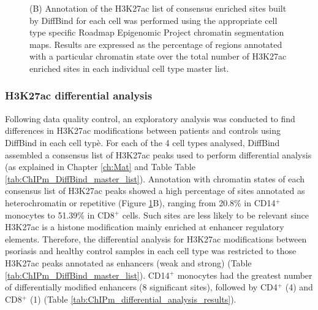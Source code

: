 \begin{figure}[htbp]
{(B) Annotation of the H3K27ac list of consensus enriched sites built by DiffBind for each cell was performed using the appropriate cell type specific Roadmap Epigenomic Project chromatin segmentation maps. Results are expressed as the percentage of regions annotated with a particular chromatin state over the total number of H3K27ac enriched sites in each individual cell type master list.}
\label{figure:ChIPm_PCA_and_chromatin_states}
\end{figure}


\subsubsection{H3K27ac differential analysis}
Following data quality control, an exploratory analysis was conducted to find differences in H3K27ac modifications between patients and controls using DiffBind in each cell typè. For each of the 4 cell types analysed, DiffBind assembled a consensus list of H3K27ac peaks used to perform differential analysis (as explained in Chapter \ref{ch:Mat} and Table Table \ref{tab:ChIPm_DiffBind_master_list}). Annotation with chromatin states of each consensus list of H3K27ac peaks showed a high percentage of sites annotated as heterochromatin or repetitive (Figure \ref{figure:ChIPm_PCA_and_chromatin_states}B), ranging from 20.8\% in CD14$^+$ monocytes to 51.39\% in CD8$^+$ cells. Such sites are less likely to be relevant since H3K27ac is a histone modification mainly enriched at enhancer regulatory elements. Therefore, the differential analysis for H3K27ac modifications between psoriasis and healthy control samples in each cell type was restricted to those H3K27ac peaks annotated as enhancers (weak and strong) (Table \ref{tab:ChIPm_DiffBind_master_list}). CD14$^+$ monocytes had the greatest number of differentially modified enhancers (8 significant sites), followed by CD4$^+$ (4) and CD8$^+$ (1) (Table \ref{tab:ChIPm_differential_analysis_results}).



